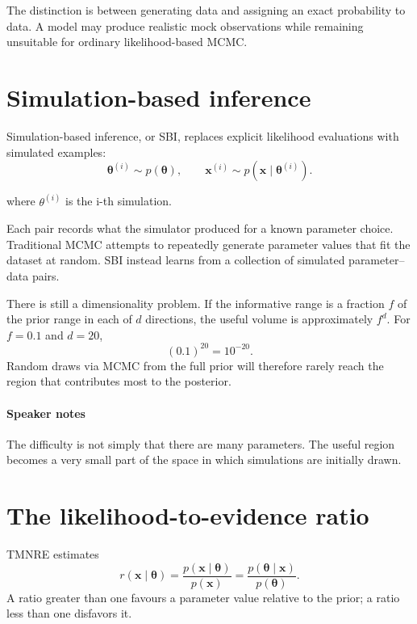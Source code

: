 ﻿\documentclass[13pt,a4paper]{article}
\begin{document}
The distinction is between generating data and assigning an exact probability to data. A model may produce realistic mock observations while remaining unsuitable for ordinary likelihood-based MCMC.

\section*{Simulation-based inference}

Simulation-based inference, or SBI, replaces explicit likelihood evaluations with simulated examples:
\begin{equation}
\bm{\theta}^{(i)}\sim p(\bm{\theta}),\qquad
\bm{x}^{(i)}\sim p(\bm{x}\mid\bm{\theta}^{(i)}).
\end{equation}

where $\theta^{(i)}$ is the i-th simulation.

Each pair records what the simulator produced for a known parameter choice. Traditional MCMC attempts to repeatedly generate parameter values that fit the dataset at random. SBI instead learns from a collection of simulated parameter--data pairs.

There is still a dimensionality problem. If the informative range is a fraction $f$ of the prior range in each of $d$ directions, the useful volume is approximately $f^d$. For $f=0.1$ and $d=20$,
\[
(0.1)^{20}=10^{-20}.
\]
Random draws via MCMC from the full prior will therefore rarely reach the region that contributes most to the posterior.

\paragraph{Speaker notes}

The difficulty is not simply that there are many parameters. The useful region becomes a very small part of the space in which simulations are initially drawn.

\section*{The likelihood-to-evidence ratio}

TMNRE estimates
\begin{equation}
r(\bm{x}\mid\bm{\theta})=
\frac{p(\bm{x}\mid\bm{\theta})}{p(\bm{x})}
=\frac{p(\bm{\theta}\mid\bm{x})}{p(\bm{\theta})}.
\end{equation}
A ratio greater than one favours a parameter value relative to the prior; a ratio less than one disfavors it.
\end{document}
